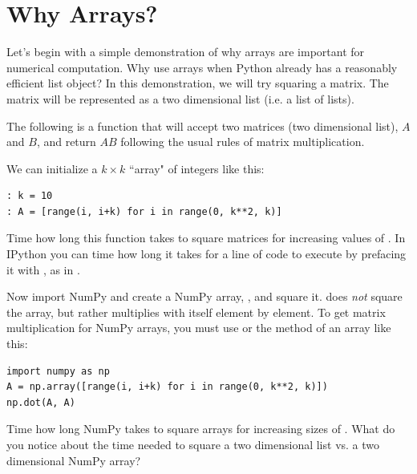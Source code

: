 
\section*{Why Arrays?}
Let's begin with a simple demonstration of why arrays are important for numerical computation.
Why use arrays when Python already has a reasonably efficient list object?
In this demonstration, we will try squaring a matrix.
The matrix will be represented as a two dimensional list (i.e. a list of lists).

The following is a function that will accept two matrices (two dimensional list), $A$ and $B$, and return $AB$ following the usual rules of matrix multiplication.

We can initialize a $k \times k$ ``array" of integers like this:
\begin{lstlisting}
: k = 10
: A = [range(i, i+k) for i in range(0, k**2, k)]
\end{lstlisting}

\begin{problem}
Time how long this function takes to square matrices for increasing values of .
In IPython you can time how long it takes for a line of code to execute by prefacing it with , as in .

Now import NumPy and create a NumPy array, , and square it.
 does \emph{not} square the array, but rather multiplies  with itself element by element.
To get matrix multiplication for NumPy arrays, you must use  or the  method of an array like this:
\begin{lstlisting}
import numpy as np
A = np.array([range(i, i+k) for i in range(0, k**2, k)])
np.dot(A, A)
\end{lstlisting}
Time how long NumPy takes to square arrays for increasing sizes of .
What do you notice about the time needed to square a two dimensional list vs. a two dimensional NumPy array?
\end{problem}

